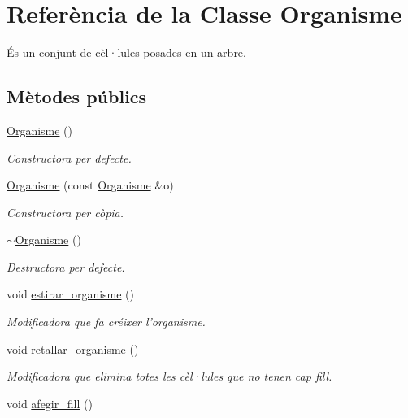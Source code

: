 \hypertarget{class_organisme}{\section{Referència de la Classe Organisme}
\label{class_organisme}
}


És un conjunt de cèl·lules posades en un arbre.  


\subsection*{Mètodes públics}
\begin{DoxyCompactItemize}
\item 
\hyperlink{class_organisme_a5624eb8adf14bc96d783067d51605fbd}{Organisme} ()
\begin{DoxyCompactList}\small\item\em Constructora per defecte. \end{DoxyCompactList}\item 
\hyperlink{class_organisme_a185bb1fe4199489f8c36b6ad53bdd562}{Organisme} (const \hyperlink{class_organisme}{Organisme} \&o)
\begin{DoxyCompactList}\small\item\em Constructora per còpia. \end{DoxyCompactList}\item 
\hyperlink{class_organisme_a55c9d7cbc9683970ad88455fdc3be7aa}{$\sim$\-Organisme} ()
\begin{DoxyCompactList}\small\item\em Destructora per defecte. \end{DoxyCompactList}\item 
void \hyperlink{class_organisme_a41a2ea17f4287dc3d00a45476a602309}{estirar\-\_\-organisme} ()
\begin{DoxyCompactList}\small\item\em Modificadora que fa créixer l'organisme. \end{DoxyCompactList}\item 
void \hyperlink{class_organisme_a3db36c1cb9d93f2750fd033b137dc702}{retallar\-\_\-organisme} ()
\begin{DoxyCompactList}\small\item\em Modificadora que elimina totes les cèl·lules que no tenen cap fill. \end{DoxyCompactList}\item 
void \hyperlink{class_organisme_a110dc312e8d2d5a4e22042903c52ed57}{afegir\-\_\-fill} ()

\end{DoxyCompactItemize}

